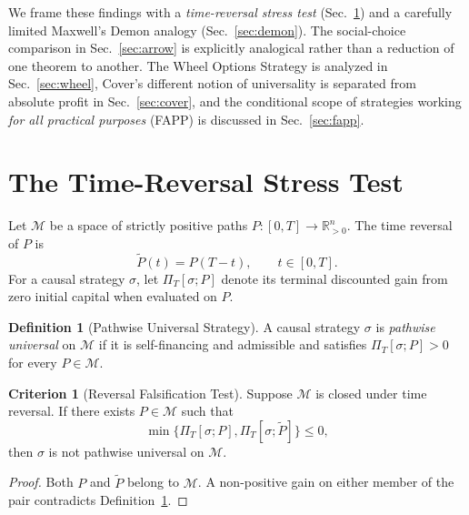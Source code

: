 \documentclass[aps,pra,reprint,superscriptaddress,amsmath,amssymb]{revtex4-2}
\theoremstyle{plain}
\theoremstyle{definition}
\newtheorem{definition}{Definition}
\newtheorem{criterion}{Criterion}
\theoremstyle{remark}
\begin{document}
We frame these findings with a \emph{time-reversal stress test}
(Sec.~\ref{sec:criterion}) and a carefully limited Maxwell's Demon analogy
(Sec.~\ref{sec:demon}). The social-choice comparison in
Sec.~\ref{sec:arrow} is explicitly analogical rather than a reduction of one
theorem to another. The Wheel Options Strategy is analyzed in
Sec.~\ref{sec:wheel}, Cover's different notion of universality is separated
from absolute profit in Sec.~\ref{sec:cover}, and the conditional scope of
strategies working \emph{for all practical purposes} (FAPP) is discussed in
Sec.~\ref{sec:fapp}.

\section{The Time-Reversal Stress Test}
\label{sec:criterion}

Let \(\mathcal{M}\) be a space of strictly positive paths
\(P\colon[0,T]\to\mathbb{R}_{>0}^n\). The time reversal of \(P\) is
\begin{equation}
  \widetilde{P}(t)=P(T-t), \qquad t\in[0,T].
  \label{eq:timereversal}
\end{equation}
For a causal strategy \(\sigma\), let \(\Pi_T[\sigma;P]\) denote its terminal
discounted gain from zero initial capital when evaluated on \(P\).

\begin{definition}[Pathwise Universal Strategy]
\label{def:universal}
  A causal strategy \(\sigma\) is \emph{pathwise universal} on
  \(\mathcal{M}\) if it is self-financing and admissible and satisfies
  \(\Pi_T[\sigma;P]>0\) for every \(P\in\mathcal{M}\).
\end{definition}

\begin{criterion}[Reversal Falsification Test]
  \label{crit:tr}
  Suppose \(\mathcal{M}\) is closed under time reversal. If there exists
  \(P\in\mathcal{M}\) such that
  \begin{equation}
    \min\{\Pi_T[\sigma;P],\Pi_T[\sigma;\widetilde P]\}\leq 0,
    \label{eq:reversaltest}
  \end{equation}
  then \(\sigma\) is not pathwise universal on \(\mathcal{M}\).
\end{criterion}

\begin{proof}
Both \(P\) and \(\widetilde P\) belong to \(\mathcal{M}\). A non-positive gain
on either member of the pair contradicts Definition~\ref{def:universal}.
\end{proof}
\end{document}
